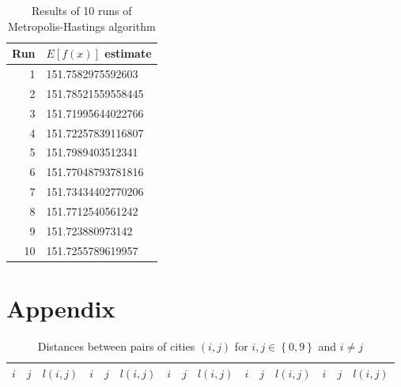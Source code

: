 \documentclass[6pt,oneside]{article}
\begin{document}
\begin{table}[h]
    \center
    \caption{Results of 10 runs of Metropolis-Hastings algorithm}
    \label{fig:12}
    \begin{tabular}{rl}
        Run & $E\left[ f(x) \right]$ estimate \\
        \hline
        1 & 151.7582975592603 \\
        2 & 151.78521559558445 \\
        3 & 151.71995644022766 \\
        4 & 151.72257839116807 \\
        5 & 151.7989403512341 \\
        6 & 151.77048793781816 \\
        7 & 151.73434402770206 \\
        8 & 151.7712540561242 \\
        9 & 151.723880973142 \\
        10 & 151.7255789619957 \\
    \end{tabular}
\end{table}

\clearpage

\section*{Appendix}

\begin{table}[h]
    \center
    \caption{Distances between pairs of cities $(i,j)$ for $i,j \in \left\lbrace 0, 9\right\rbrace$ and $i\neq j$}
    \label{table:distances}
    \footnotesize
    \begin{tabular}{ccc|ccc|ccc|ccc|ccc}
        $i$ & $j$ & $ l(i, j)$ &
        $i$ & $j$ & $ l(i, j)$ &
        $i$ & $j$ & $ l(i, j)$ &
        $i$ & $j$ & $ l(i, j)$ &
        $i$ & $j$ & $ l(i, j)$
        \\
        \hline

    \end{tabular}
\end{table}
\end{document}
